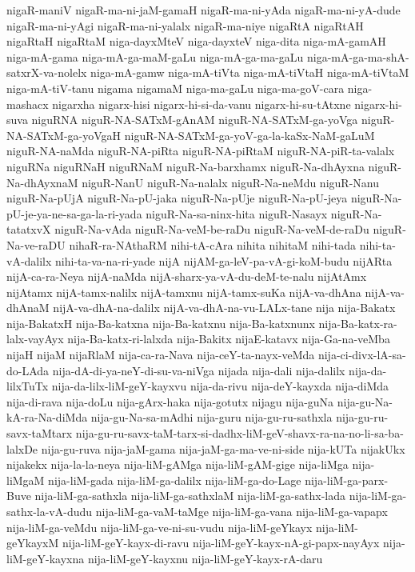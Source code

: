 {nigaR-maniV
nigaR-ma-ni-jaM-gamaH
nigaR-ma-ni-yAda
nigaR-ma-ni-yA-dude
nigaR-ma-ni-yAgi
nigaR-ma-ni-yalalx
nigaR-ma-niye
nigaRtA
nigaRtAH
nigaRtaH
nigaRtaM
niga-dayxMteV
niga-dayxteV
niga-dita
niga-mA-gamAH
niga-mA-gama
niga-mA-ga-maM-gaLu
niga-mA-ga-ma-gaLu
niga-mA-ga-ma-shA-satxrX-va-nolelx
niga-mA-gamw
niga-mA-tiVta
niga-mA-tiVtaH
niga-mA-tiVtaM
niga-mA-tiV-tanu
nigama
nigamaM
niga-ma-gaLu
niga-ma-goV-cara
niga-mashacx
nigarxha
nigarx-hisi
nigarx-hi-si-da-vanu
nigarx-hi-su-tAtxne
nigarx-hi-suva
niguRNA
niguR-NA-SATxM-gAnAM
niguR-NA-SATxM-ga-yoVga
niguR-NA-SATxM-ga-yoVgaH
niguR-NA-SATxM-ga-yoV-ga-la-kaSx-NaM-gaLuM
niguR-NA-naMda
niguR-NA-piRta
niguR-NA-piRtaM
niguR-NA-piR-ta-valalx
niguRNa
niguRNaH
niguRNaM
niguR-Na-barxhamx
niguR-Na-dhAyxna
niguR-Na-dhAyxnaM
niguR-NanU
niguR-Na-nalalx
niguR-Na-neMdu
niguR-Nanu
niguR-Na-pUjA
niguR-Na-pU-jaka
niguR-Na-pUje
niguR-Na-pU-jeya
niguR-Na-pU-je-ya-ne-sa-ga-la-ri-yada
niguR-Na-sa-ninx-hita
niguR-Nasayx
niguR-Na-tatatxvX
niguR-Na-vAda
niguR-Na-veM-be-raDu
niguR-Na-veM-de-raDu
niguR-Na-ve-raDU
nihaR-ra-NAthaRM
nihi-tA-cAra
nihita
nihitaM
nihi-tada
nihi-ta-vA-dalilx
nihi-ta-va-na-ri-yade
nijA
nijAM-ga-leV-pa-vA-gi-koM-budu
nijARta
nijA-ca-ra-Neya
nijA-naMda
nijA-sharx-ya-vA-du-deM-te-nalu
nijAtAmx
nijAtamx
nijA-tamx-nalilx
nijA-tamxnu
nijA-tamx-suKa
nijA-va-dhAna
nijA-va-dhAnaM
nijA-va-dhA-na-dalilx
nijA-va-dhA-na-vu-LALx-tane
nija
nija-Bakatx
nija-BakatxH
nija-Ba-katxna
nija-Ba-katxnu
nija-Ba-katxnunx
nija-Ba-katx-ra-lalx-vayAyx
nija-Ba-katx-ri-lalxda
nija-Bakitx
nijaE-katavx
nija-Ga-na-veMba
nijaH
nijaM
nijaRlaM
nija-ca-ra-Nava
nija-ceY-ta-nayx-veMda
nija-ci-divx-lA-sa-do-LAda
nija-dA-di-ya-neY-di-su-va-niVga
nijada
nija-dali
nija-dalilx
nija-da-lilxTuTx
nija-da-lilx-liM-geY-kayxvu
nija-da-rivu
nija-deY-kayxda
nija-diMda
nija-di-rava
nija-doLu
nija-gArx-haka
nija-gotutx
nijagu
nija-guNa
nija-gu-Na-kA-ra-Na-diMda
nija-gu-Na-sa-mAdhi
nija-guru
nija-gu-ru-sathxla
nija-gu-ru-savx-taMtarx
nija-gu-ru-savx-taM-tarx-si-dadhx-liM-geV-shavx-ra-na-no-li-sa-ba-lalxDe
nija-gu-ruva
nija-jaM-gama
nija-jaM-ga-ma-ve-ni-side
nija-kUTa
nijakUkx
nijakekx
nija-la-la-neya
nija-liM-gAMga
nija-liM-gAM-gige
nija-liMga
nija-liMgaM
nija-liM-gada
nija-liM-ga-dalilx
nija-liM-ga-do-Lage
nija-liM-ga-parx-Buve
nija-liM-ga-sathxla
nija-liM-ga-sathxlaM
nija-liM-ga-sathx-lada
nija-liM-ga-sathx-la-vA-dudu
nija-liM-ga-vaM-taMge
nija-liM-ga-vana
nija-liM-ga-vapapx
nija-liM-ga-veMdu
nija-liM-ga-ve-ni-su-vudu
nija-liM-geYkayx
nija-liM-geYkayxM
nija-liM-geY-kayx-di-ravu
nija-liM-geY-kayx-nA-gi-papx-nayAyx
nija-liM-geY-kayxna
nija-liM-geY-kayxnu
nija-liM-geY-kayx-rA-daru
}
